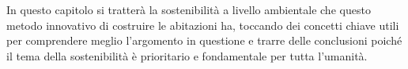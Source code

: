 In questo capitolo si tratterà la sostenibilità a livello ambientale che questo metodo innovativo di costruire le abitazioni ha, toccando dei concetti chiave utili per comprendere meglio l’argomento in questione e trarre delle conclusioni poiché il tema della sostenibilità è prioritario e fondamentale per tutta l’umanità.